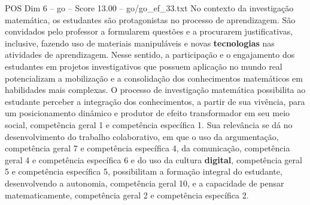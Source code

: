 \begin{textsample}{POS Dim 6 – go – Score 13.00 – go/go\_ef\_33.txt}
No contexto da investigação matemática, os estudantes são protagonistas no processo de aprendizagem.
São convidados pelo professor a formularem questões e a procurarem justificativas, inclusive, fazendo uso de materiais manipuláveis e novas \textbf{tecnologias} nas atividades de aprendizagem.
Nesse sentido, a participação e o engajamento dos estudantes em projetos investigativos que possuem aplicação no mundo real potencializam a mobilização e a consolidação dos conhecimentos matemáticos em habilidades mais complexas.
O processo de investigação matemática possibilita ao estudante perceber a integração dos conhecimentos, a partir de sua vivência, para um posicionamento dinâmico e produtor de efeito transformador em seu meio social, competência geral 1 e competência específica 1.
Sua relevância se dá no desenvolvimento do trabalho colaborativo, em que o uso da argumentação, competência geral 7 e competência específica 4, da comunicação, competência geral 4 e competência específica 6 e do uso da cultura \textbf{digital}, competência geral 5 e competência específica 5, possibilitam a formação integral do estudante, desenvolvendo a autonomia, competência geral 10, e a capacidade de pensar matematicamente, competência geral 2 e competência específica 2.

\end{textsample}
